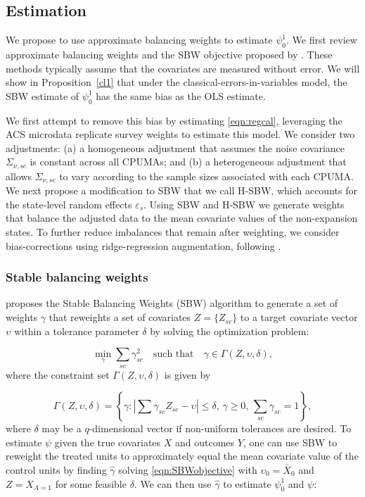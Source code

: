 \documentclass[aoas]{imsart}
\theoremstyle{plain}
\theoremstyle{remark}
\begin{document}
\subsection{Estimation}\label{ssec:estimation}

We propose to use approximate balancing weights to estimate $\psi_0^1$. We first review approximate balancing weights and the SBW objective proposed by \cite{zubizarreta2015stable}. These methods typically assume that the covariates are measured without error. We will show in Proposition~\ref{cl1} that under the classical-errors-in-variables model, the SBW estimate of $\psi_0^1$ has the same bias as the OLS estimate.

We first attempt to remove this bias by estimating \eqref{eqn:regcal}, leveraging the ACS microdata replicate survey weights to estimate this model. We consider two adjustments: (a) a homogeneous adjustment that assumes the noise covariance $\Sigma_{\nu, sc}$ is constant across all CPUMAs; and (b) a heterogeneous adjustment that allows $\Sigma_{\nu,sc}$ to vary according to the sample sizes associated with each CPUMA. We next propose a modification to SBW that we call H-SBW, which accounts for the state-level random effects $\varepsilon_s$. Using SBW and H-SBW we generate weights that balance the adjusted data to the mean covariate values of the non-expansion states. To further reduce imbalances that remain after weighting, we consider bias-corrections using ridge-regression augmentation, following \cite{ben2021augmented}. 

\subsubsection{Stable balancing weights}\label{ssec:SBW}

\cite{zubizarreta2015stable} proposes the Stable Balancing Weights (SBW) algorithm to generate a set of weights $\gamma$ that reweights a set of covariates $Z = \{Z_{sc}\}$ to a target covariate vector $\upsilon$ within a tolerance parameter $\delta$ by solving the optimization problem:

\begin{equation}\label{eqn:SBWobjective}
 \min_{\gamma} \sum_{sc} \gamma_{sc}^2 \quad \text{such that} \quad \gamma \in \Gamma(Z, \upsilon, \delta),
\end{equation}
%
where the constraint set $\Gamma(Z, \upsilon, \delta)$ is given by

\[ \Gamma(Z, \upsilon, \delta) = \left\{\gamma: \left|\sum \gamma_{sc} Z_{sc}  - \upsilon\right| \leq \delta,\, \gamma \geq 0,\, \sum_{sc} \gamma_{sc} = 1\right\},\]
%
where $\delta$ may be a $q$-dimensional vector if non-uniform tolerances are desired. To estimate $\psi$ given the true covariates $X$ and outcomes $Y$, one can use SBW to reweight the treated units to approximately equal the mean covariate value of the control units by finding $\hat{\gamma}$ solving \eqref{eqn:SBWobjective} with $\upsilon_0 = \bar{X}_0$ and $Z = X_{A=1}$ for some feasible $\delta$. We can then use $\hat{\gamma}$ to estimate $\psi_0^1$ and $\psi$:
\end{document}
